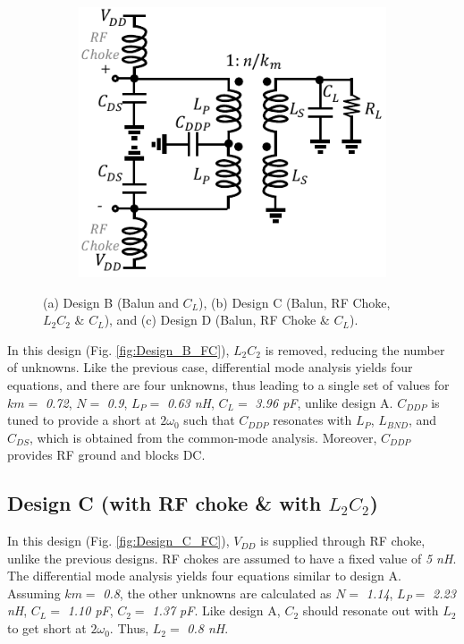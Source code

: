 \documentclass[conference]{IEEEtran}
\begin{document}
\begin{figure}[!t]
\begin{subfigure}{0.15\textwidth}
\includegraphics[width=1\textwidth]{Images/Design/Design_D_FC.pdf}
\caption{}
\label{fig:Design_D_FC}
\end{subfigure}
\caption{(a) Design B (Balun and $C_L$), (b) Design C (Balun, RF Choke, $L_2C_2$ \& $C_L$), and (c) Design D (Balun, RF Choke \& $C_L$).}
\label{fig:Design_B_C_D}
\vspace{-0.25in}
\end{figure}

In this design (Fig. \ref{fig:Design_B_FC}), $L_2C_2$ is removed, reducing the number of unknowns. Like the previous case, differential mode analysis yields four equations, and there are four unknowns, thus leading to a single set of values for $km =$ \textit{0.72}, $N =$ \textit{0.9}, $L_P =$ \textit{0.63 nH}, $C_L =$ \textit{3.96 pF}, unlike design A. $C_{DDP}$ is tuned to provide a short at $2\omega_0$ such that $C_{DDP}$ resonates with $L_P$, $L_{BND}$, and $C_{DS}$, which is obtained from the common-mode analysis. Moreover, $C_{DDP}$ provides RF ground and blocks DC.

\subsection{Design C (with RF choke \& with $L_2C_2$)}
In this design (Fig. \ref{fig:Design_C_FC}), $V_{DD}$ is supplied through RF choke, unlike the previous designs. RF chokes are assumed to have a fixed value of \textit{5 nH}. The differential mode analysis yields four equations similar to design A. Assuming $km =$ \textit{0.8}, the other unknowns are calculated as $N =$ \textit{1.14}, $L_P =$ \textit{2.23 nH}, $C_L =$ \textit{1.10 pF}, $C_2 =$ \textit{1.37 pF}.
Like design A, $C_2$ should resonate out with $L_2$ to get short at $2\omega_0$. Thus, $L_2 =$ \textit{0.8 nH}. 
\end{document}
